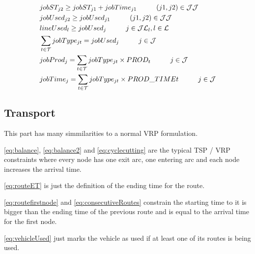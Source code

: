 \begin{align}
		& jobST_{j2} \geq jobST_{j1} + jobTime_{j1} 
				\hspace{10mm} (j1, j2) \in \mathcal{JJ} \label{eq:starttime}\\
		& jobUsed_{j2} \geq jobUsed_{j1} 
				\hspace{10mm} (j1, j2) \in \mathcal{JJ} \label{eq:jobOrder}\\
		& lineUsed_{l} \geq jobUsed_{j}
				\hspace{10mm} j \in \mathcal{JL}_l, l \in \mathcal{L} \label{eq:lineJob}\\
		& \sum_{t \in \mathcal{T}} jobType_{jt} = jobUsed_{j} 
				\hspace{10mm} j \in \mathcal{J} \label{eq:jobType}\\
		& jobProd_{j} = \sum_{t \in \mathcal{T}} jobType_{jt} \times PROD_{t}
				\hspace{10mm} j \in \mathcal{J} \label{eq:jobproduction}\\
		& jobTime_{j} = \sum_{t \in \mathcal{T}}jobType_{jt} \times PROD\_TIME{t}
				\hspace{10mm} j \in \mathcal{J} \label{eq:jobtime}\\
\end{align}

\subsection{Transport}

This part has many simmilarities to a normal VRP formulation. 

\ref{eq:balance}, \ref{eq:balance2} and \ref{eq:cyclecutting} are the typical TSP / VRP constraints where every node has one exit arc, one entering arc and each node increases the arrival time.

\ref{eq:routeET} is just the definition of the ending time for the route.

\ref{eq:routefirstnode} and \ref{eq:consecutiveRoutes} constrain the starting time to it is bigger than the ending time of the previous route and is equal to the arrival time for the first node.

\ref{eq:vehicleUsed} just marks the vehicle as used if at least one of its routes is being used.

